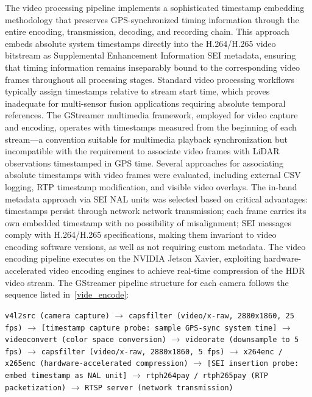 The video processing pipeline implements a sophisticated timestamp embedding methodology that preserves GPS-synchronized timing information through the entire encoding, transmission, decoding, and recording chain. This approach embeds absolute system timestamps directly into the H.264/H.265 video bitstream as Supplemental Enhancement Information \ac{SEI} metadata, ensuring that timing information remains inseparably bound to the corresponding video frames throughout all processing stages.
Standard video processing workflows typically assign timestamps relative to stream start time, which proves inadequate for multi-sensor fusion applications requiring absolute temporal references. The GStreamer multimedia framework, employed for video capture and encoding, operates with timestamps measured from the beginning of each stream---a convention suitable for multimedia playback synchronization but incompatible with the requirement to associate video frames with LiDAR observations timestamped in GPS time. Several approaches for associating absolute timestamps with video frames were evaluated, including external CSV logging, \ac{RTP} timestamp modification, and visible video overlays. The in-band metadata approach via \ac{SEI} \ac{NAL} units was selected based on critical advantages: timestamps persist through network network transmission; each frame carries its own embedded timestamp with no possibility of misalignment; \ac{SEI} messages comply with H.264/H.265 specifications, making them invariant to video encoding software versions, as well as not requiring custom metadata.
The video encoding pipeline executes on the NVIDIA Jetson Xavier, exploiting hardware-accelerated video encoding engines to achieve real-time compression of the HDR video stream. The GStreamer pipeline structure for each camera follows the sequence listed in~\ref{vide_encode}: 

\begin{algorithm}
\caption{Transmit Pipeline (Jetson Xavier)}
\begin{algorithmic}[1]
\State \texttt{v4l2src (camera capture)}
\State $\rightarrow$ \texttt{capsfilter (video/x-raw, 2880x1860, 25 fps)}
\State $\rightarrow$ \texttt{[timestamp capture probe: sample GPS-sync system time]}
\State $\rightarrow$ \texttt{videoconvert (color space conversion)}
\State $\rightarrow$ \texttt{videorate (downsample to 5 fps)}
\State $\rightarrow$ \texttt{capsfilter (video/x-raw, 2880x1860, 5 fps)}
\State $\rightarrow$ \texttt{x264enc / x265enc (hardware-accelerated compression)}
\State $\rightarrow$ \texttt{[SEI insertion probe: embed timestamp as NAL unit]}
\State $\rightarrow$ \texttt{rtph264pay / rtph265pay (RTP packetization)}
\State $\rightarrow$ \texttt{RTSP server (network transmission)}
\end{algorithmic} \label{vide_encode}
\end{algorithm}

